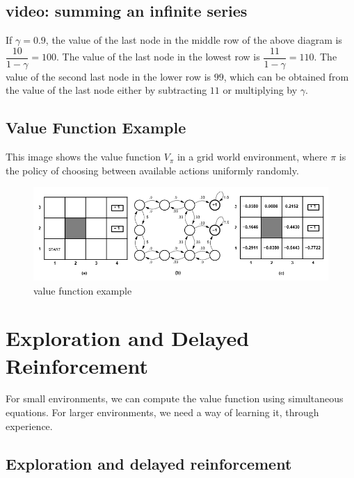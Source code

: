 \documentclass[11pt]{article}
\begin{document}
\subsection{video: summing an infinite series}\label{subsec:summing-an-infinite-series}
If $\gamma = 0.9$, the value of the last node in the middle row of the above
diagram is $\dfrac{10}{1 - \gamma} = 100$.
The value of the last node in the lowest row is $\dfrac{11}{1 - \gamma} = 110$.
The value of the second last node in the lower row is $99$, which can be
obtained from the value of the last node either by subtracting $11$ or
multiplying by $\gamma$.

\subsection{Value Function Example}\label{subsec:value-function-example}
This image shows the value function $V_{\pi}$ in a grid world environment,
where $\pi$ is the policy of choosing between available actions uniformly
randomly.

\begin{figure}[h]
    \centering
    \includegraphics[width=\textwidth]{../out/images/value-function-example}
    \caption[value function example]{value function example}
    \label{fig:value function example}
\end{figure}

\section{Exploration and Delayed Reinforcement}\label{sec:exploration-and-delayed-reinforcement}

For small environments, we can compute the value function using simultaneous
equations.
For larger environments, we need a way of learning it, through experience.

\subsection{Exploration and delayed reinforcement}\label{subsec:exploration-and-delayed-reinforcement}
\end{document}
